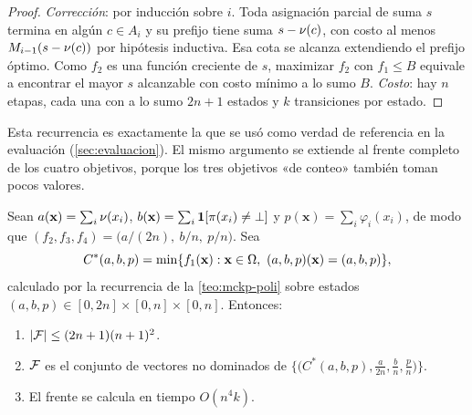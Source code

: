 \begin{proof}
\emph{Corrección}: por inducción sobre $i$. Toda asignación parcial de suma
$s$ termina en algún $c\in A_i$ y su prefijo tiene suma $s-\nu(c)$, con
costo al menos $M_{i-1}(s-\nu(c))$ por hipótesis inductiva. Esa cota se
alcanza extendiendo el prefijo óptimo. Como $f_2$ es una función creciente de
$s$, maximizar $f_2$ con $f_1\leq B$ equivale a encontrar el mayor $s$
alcanzable con costo mínimo a lo sumo $B$. \emph{Costo}: hay $n$ etapas,
cada una con a lo sumo $2n+1$ estados y $k$ transiciones por estado.
\end{proof}

Esta recurrencia es exactamente la que se usó como verdad de referencia en la
evaluación (\cref{sec:evaluacion}). El mismo argumento se extiende al frente
completo de los cuatro objetivos, porque los tres objetivos «de conteo»
también toman pocos valores.

\begin{teorema}
\label{teo:frente-poli}
Sean $a(\mathbf{x})=\sum_i\nu(x_i)$, $b(\mathbf{x})=\sum_i\mathbf{1}\!\left[\pi(x_i)\neq\bot\right]$
y $p(\mathbf{x})=\sum_i\varphi_i(x_i)$, de modo que
$(f_2,f_3,f_4)=\bigl(a/(2n),\ b/n,\ p/n\bigr)$. Sea
\[
  C^\ast(a,b,p)=\min\{f_1(\mathbf{x}) : \mathbf{x}\in\Omega,\ (a,b,p)(\mathbf{x})=(a,b,p)\},
\]
calculado por la recurrencia de la \cref{teo:mckp-poli} sobre estados
$(a,b,p)\in[0,2n]\times[0,n]\times[0,n]$. Entonces:
\begin{enumerate}
  \item $\left\lvert \mathcal{F} \right\rvert\leq(2n+1)(n+1)^2$.
  \item $\mathcal{F}$ es el conjunto de vectores no dominados de
        $\bigl\{\bigl(C^\ast(a,b,p),\tfrac{a}{2n},\tfrac bn,\tfrac pn\bigr)\bigr\}$.
  \item El frente se calcula en tiempo $O(n^4k)$.
\end{enumerate}
\end{teorema}

